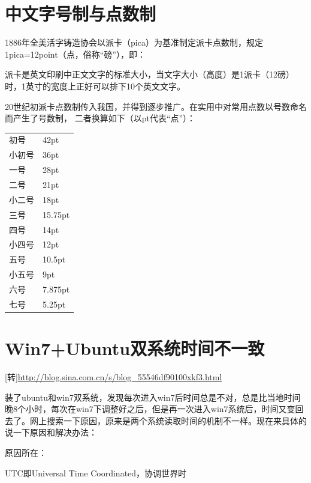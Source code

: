 {\section{中文字号制与点数制}
1886年全美活字铸造协会以派卡（pica）为基准制定派卡点数制，规定1pica=12point（点，俗称“磅”），即：
\begin{center}
\end{center}
\begin{center}
\end{center}



派卡是英文印刷中正文文字的标准大小，当文字大小（高度）是1派卡（12磅）时，1英寸的宽度上正好可以排下10个英文文字。

20世纪初派卡点数制传入我国，并得到逐步推广。在实用中对常用点数以号数命名而产生了号数制，
 二者换算如下（以pt代表“点”）：
 \begin{center}
 \begin{tabular}{l@{ = }l}
初号& 42pt\\
小初号& 36pt\\
 一号& 28pt\\
 二号& 21pt\\
小二号& 18pt\\
三号& 15.75pt\\
四号& 14pt\\
小四号& 12pt\\
五号& 10.5pt\\
小五号& 9pt\\
六号 & 7.875pt\\
七号 & 5.25pt
\end{tabular}
\end{center}




\section{Win7+Ubuntu双系统时间不一致}
 [转]\url{http://blog.sina.com.cn/s/blog_55546df90100xkf3.html}

装了ubuntu和win7双系统，发现每次进入win7后时间总是不对，总是比当地时间晚8个小时，每次在win7下调整好之后，但是再一次进入win7系统后，时间又变回去了。网上搜索一下原因，原来是两个系统读取时间的机制不一样。现在来具体的说一下原因和解决办法：

 原因所在：

UTC即Universal Time Coordinated，协调世界时

}
